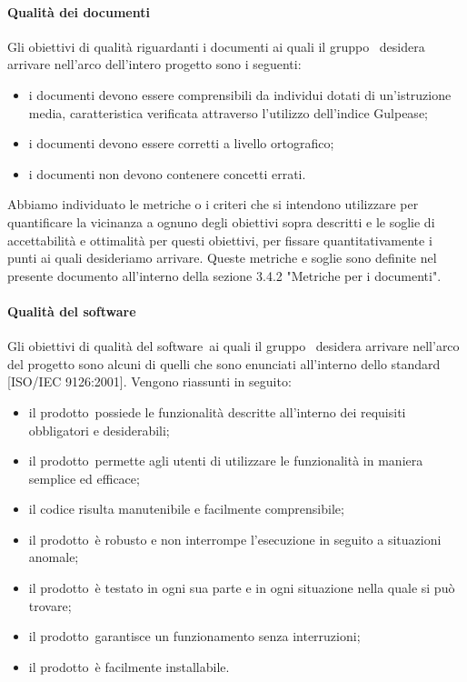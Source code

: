 \documentclass[../PianoDiQualifica.tex]{subfiles}
\begin{document}
			\paragraph{Qualità dei documenti}
			Gli obiettivi di qualità riguardanti i documenti ai quali il gruppo \leaf\ desidera arrivare nell'arco dell'intero progetto sono i seguenti:
			\begin{itemize}
				\item i documenti devono essere comprensibili da individui dotati di un'istruzione media, caratteristica verificata attraverso l'utilizzo dell'indice Gulpease\g;
				\item i documenti devono essere corretti a livello ortografico;
				\item i documenti non devono contenere concetti errati.
			\end{itemize}
			Abbiamo individuato le metriche o i criteri che si intendono utilizzare per quantificare la vicinanza a ognuno degli obiettivi sopra descritti e le soglie di accettabilità e ottimalità per questi obiettivi, per fissare quantitativamente i punti ai quali desideriamo arrivare. Queste metriche e soglie sono definite nel presente documento all'interno della sezione 3.4.2 "Metriche per i documenti".
			\paragraph{Qualità del software}
			Gli obiettivi di qualità del software\g\ ai quali il gruppo \leaf\ desidera arrivare nell'arco del progetto sono alcuni di quelli che sono enunciati all'interno dello standard [ISO/IEC 9126:2001]. Vengono riassunti in seguito:
			\begin{itemize}
				\item il prodotto\g\ possiede le funzionalità descritte all'interno dei requisiti obbligatori e desiderabili;
				\item il prodotto\g\ permette agli utenti di utilizzare le funzionalità in maniera semplice ed efficace;
				\item il codice risulta manutenibile e facilmente comprensibile;
				\item il prodotto\g\ è robusto e non interrompe l'esecuzione in seguito a situazioni anomale;
				\item il prodotto\g\ è testato in ogni sua parte e in ogni situazione nella quale si può trovare;
				\item il prodotto\g{}arantisce un funzionamento senza interruzioni;
				\item il prodotto\g\ è facilmente installabile.
			\end{itemize}
\end{document}
